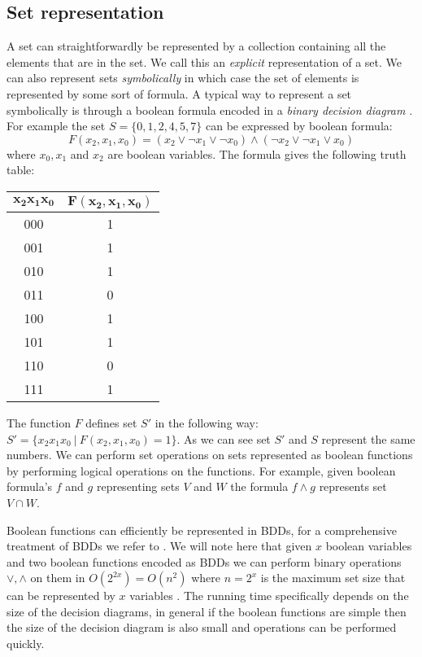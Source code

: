\subsection{Set representation}
A set can straightforwardly be represented by a collection containing all the elements that are in the set. We call this an \textit{explicit} representation of a set. We can also represent sets \textit{symbolically} in which case the set of elements is represented by some sort of formula. A typical way to represent a set symbolically is through a boolean formula encoded in a \textit{binary decision diagram} \cite{BDD_book,Handbook_BDD_Chapter}. For example the set $S = \{0,1,2,4,5,7 \}$ can be expressed by boolean formula:
\[ F(x_2,x_1,x_0) = (x_2 \vee \neg x_1 \vee \neg x_0) \wedge (\neg x_2 \vee \neg x_1 \vee x_0) \]
where $x_0,x_1$ and $x_2$ are boolean variables. The formula gives the following truth table:\\
\begin{center}
	\begin{tabular}{|c|c|}
		\hline 
		$\mathbf{x_2x_1x_0}$ & $\mathbf{F(x_2,x_1,x_0)}$ \\ 
		\hline 
		000 & 1 \\ 
		\hline 
		001 & 1 \\ 
		\hline 
		010 & 1 \\ 
		\hline 
		011 & 0 \\ 
		\hline 
		100 & 1 \\ 
		\hline 
		101 & 1 \\ 
		\hline 
		110 & 0 \\ 
		\hline 
		111 & 1 \\ 
		\hline 
	\end{tabular} 
\end{center}
The function $F$ defines set $S'$ in the following way: $S' = \{x_2x_1x_0\ |\ F(x_2,x_1,x_0) = 1 \}$. As we can see set $S'$ and $S$ represent the same numbers. We can perform set operations on sets represented as boolean functions by performing logical operations on the functions. For example, given boolean formula's $f$ and $g$ representing sets $V$ and $W$ the formula $f \wedge g$ represents set $V \cap W$.

Boolean functions can efficiently be represented in BDDs, for a comprehensive treatment of BDDs we refer to \cite{BDD_book,Handbook_BDD_Chapter}. We will note here that given $x$ boolean variables and two boolean functions encoded as BDDs we can perform binary operations $\vee,\wedge$ on them in $O(2^{2x})=O(n^2)$ where $n = 2^x$ is the maximum set size that can be represented by $x$ variables \cite{BDD_running_time,Handbook_BDD_Chapter}. The running time specifically depends on the size of the decision diagrams, in general if the boolean functions are simple then the size of the decision diagram is also small and operations can be performed quickly.
